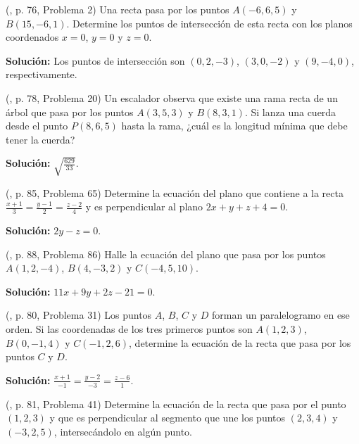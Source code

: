 \begin{prob} (\cite{espinoza2006Algebralineal}, p. 76, Problema 2) Una recta pasa por los puntos $A(-6,6,5)$ y $B(15,-6,1)$. Determine los puntos de intersección de esta recta con los planos coordenados $x=0$, $y=0$ y $z=0$. 

\textbf{Solución:} Los puntos de intersección son $(0,2,-3)$, $(3,0,-2)$ y $(9,-4,0)$, respectivamente.
\end{prob}

\begin{prob} (\cite{espinoza2006Algebralineal}, p. 78, Problema 20) Un escalador observa que existe una rama recta de un árbol que pasa por los puntos $A(3,5,3)$ y $B(8,3,1)$. Si lanza una cuerda desde el punto $P(8,6,5)$ hasta la rama, ¿cuál es la longitud mínima que debe tener la cuerda? 

\textbf{Solución:} $\sqrt{\frac{629}{33}}$.
\end{prob}

\begin{prob} (\cite{espinoza2006Algebralineal}, p. 85, Problema 65) Determine la ecuación del plano que contiene a la recta $\frac{x+1}{3}=\frac{y-1}{2}=\frac{z-2}{4}$ y es perpendicular al plano $2x+y+z+4=0$. 

\textbf{Solución:} $2y-z=0$.
\end{prob}

\begin{prob} (\cite{espinoza2006Algebralineal}, p. 88, Problema 86) Halle la ecuación del plano que pasa por los puntos $A(1,2,-4)$, $B(4,-3,2)$ y $C(-4,5,10)$. 

\textbf{Solución:} $11x+9y+2z-21=0$.
\end{prob}

\begin{prob} (\cite{espinoza2006Algebralineal}, p. 80, Problema 31) Los puntos $A$, $B$, $C$ y $D$ forman un paralelogramo en ese orden. Si las coordenadas de los tres primeros puntos son $A(1,2,3)$, $B(0,-1,4)$ y $C(-1,2,6)$, determine la ecuación de la recta que pasa por los puntos $C$ y $D$. 

\textbf{Solución:} $\frac{x+1}{-1}=\frac{y-2}{-3}=\frac{z-6}{1}$.
\end{prob}

\begin{prob} (\cite{espinoza2006Algebralineal}, p. 81, Problema 41) Determine la ecuación de la recta que pasa por el punto $(1,2,3)$ y que es perpendicular al segmento que une los puntos $(2,3,4)$ y $(-3,2,5)$, intersecándolo en algún punto.
\end{prob}

